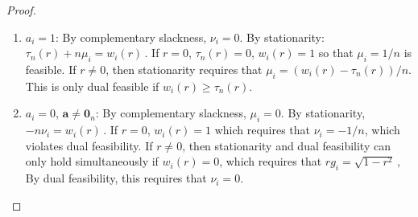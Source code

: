 \documentclass{article}
\theoremstyle{definition}
\newcommand*{\bb}{\boldsymbol}
\begin{document}
\begin{bibunit}
\begin{proof}
\begin{enumerate}[label=(\roman{*})]
		can occur. If $\lambda(r)>0$, then $\tau_n(r)>0$ and
		$$
		a_i=\frac{w_i(r)}{\tau_n(r)}<1
		\quad\Longleftrightarrow\quad
		w_i(r)<\tau_n(r) \,.
		$$
		\item $a_i = 1$: By complementary slackness, $\nu_i = 0$. By stationarity: $\tau_n(r) + n \mu_i = w_i(r) \,.$
		If $r = 0$, $\tau_n(r) = 0$, $w_i(r) = 1$ so that $\mu_i = 1/n$ is feasible. If $r \neq 0$, then stationarity requires that $\mu_i = (w_i(r) - \tau_n(r))/n$.
		This is only dual feasible if $w_i(r) \geq \tau_n(r)$.
		\item $a_i = 0$, $\bb a \neq \bb 0_n$: By complementary slackness, $\mu_i = 0$. By stationarity, $- n \nu_i = w_i(r) \,.$
		If $r = 0$, $w_i(r) = 1$ which requires that $\nu_i = -1/n$, which violates dual feasibility. If $r \neq 0$, then stationarity and dual feasibility can only hold
		simultaneously if $w_i(r) = 0$, which requires that $r g_i = \sqrt{1 - r^2} \,,$
		By dual feasibility, this requires that $\nu_i = 0$.


\end{enumerate}
\end{proof}
\end{bibunit}
\end{document}
